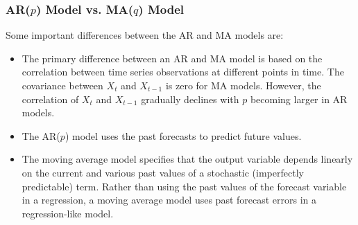 \documentclass[xcolor=dvipsnames, english, 8pt]{beamer}
\begin{document}
\begin{frame}
    \frametitle{AR($p$) Model vs. MA($q$) Model}
    Some important differences between the AR and MA models are:\vspace{0.25cm}\\
    \begin{itemize}
        \item The primary difference between an AR and MA model is based on the correlation between time series observations at different points in time. The covariance between $X_t$ and $X_{t-1}$ is zero for MA models. However, the correlation of $X_t$ and $X_{t-1}$ gradually declines with $p$ becoming larger in AR models.
        \item The AR($p$) model uses the past forecasts to predict future values.
        \item The moving average model specifies that the output variable depends linearly on the current and various past values of a stochastic (imperfectly predictable) term. Rather than using the past values of the forecast variable in a regression, a moving average model uses past forecast errors in a regression-like model.
    \end{itemize}

\end{frame}
\end{document}
